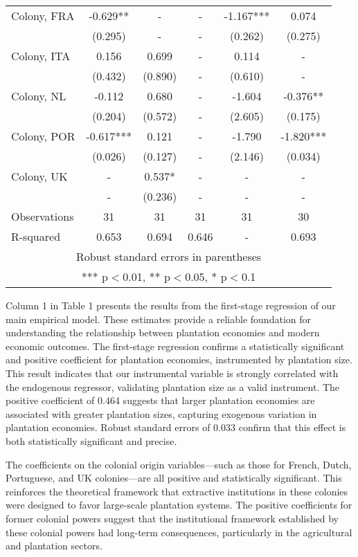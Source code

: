 \documentclass[12pt]{article}
\begin{document}
\begin{flushleft}
{\begin{tabular}{lccccc}
Colony, FRA & -0.629** & - & - & -1.167*** & 0.074 \\
 & (0.295) & - & - & (0.262) & (0.275) \\
Colony, ITA & 0.156 & 0.699 & - & 0.114 & - \\
 & (0.432) & (0.890) & - & (0.610) & - \\
Colony, NL & -0.112 & 0.680 & - & -1.604 & -0.376** \\
 & (0.204) & (0.572) & - & (2.605) & (0.175) \\
Colony, POR & -0.617*** & 0.121 & - & -1.790 & -1.820*** \\
 & (0.026) & (0.127) & - & (2.146) & (0.034) \\
Colony, UK & - & 0.537* & - & - & - \\
 & - & (0.236) & - & - & - \\
Observations & 31 & 31 & 31 & 31 & 30 \\
 R-squared & 0.653 & 0.694 & 0.646 & - & 0.693 \\ \hline
\multicolumn{6}{c}{ Robust standard errors in parentheses} \\
\multicolumn{6}{c}{ *** p$<$0.01, ** p$<$0.05, * p$<$0.1} \\
\end{tabular}
}
\end{flushleft}

\vspace{0.5 in} 
\noindent Column 1 in Table 1 presents the results from the first-stage regression of our main empirical model. These estimates provide a reliable foundation for understanding the relationship between plantation economies and modern economic outcomes. The first-stage regression confirms a statistically significant and positive coefficient for plantation economies, instrumented by plantation size. This result indicates that our instrumental variable is strongly correlated with the endogenous regressor, validating plantation size as a valid instrument. The positive coefficient of 0.464 suggests that larger plantation economies are associated with greater plantation sizes, capturing exogenous variation in plantation economies. Robust standard errors of 0.033 confirm that this effect is both statistically significant and precise.

\noindent The coefficients on the colonial origin variables—such as those for French, Dutch, Portuguese, and UK colonies—are all positive and statistically significant. This reinforces the theoretical framework that extractive institutions in these colonies were designed to favor large-scale plantation systems. The positive coefficients for former colonial powers suggest that the institutional framework established by these colonial powers had long-term consequences, particularly in the agricultural and plantation sectors.
\end{document}
